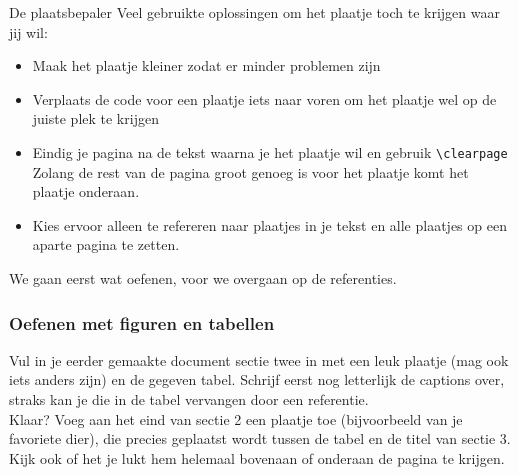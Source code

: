 \documentclass{beamer}
\begin{document}
\begin{frame}[allowframebreaks]{De plaatsbepaler}
	Veel gebruikte oplossingen om het plaatje toch te krijgen waar jij wil:
	\begin{itemize}
		\item Maak het plaatje kleiner zodat er minder problemen zijn
		\item Verplaats de code voor een plaatje iets naar voren om het plaatje wel op de juiste plek te krijgen
		\item Eindig je pagina na de tekst waarna je het plaatje wil en gebruik \texttt{\textbackslash clearpage} Zolang de rest van de pagina groot genoeg is voor het plaatje komt het plaatje onderaan.
		\item Kies ervoor alleen te refereren naar plaatjes in je tekst en alle plaatjes op een aparte pagina te zetten.
	\end{itemize}
We gaan eerst wat oefenen, voor we overgaan op de referenties.
\end{frame}

\begin{frame}
	\frametitle{Oefenen met figuren en tabellen}
	Vul in je eerder gemaakte document sectie twee in met een leuk plaatje (mag ook iets anders zijn) en de gegeven tabel. Schrijf eerst nog letterlijk de captions over, straks kan je die in de tabel vervangen door een referentie. \\
	Klaar?	Voeg aan het eind van sectie 2 een plaatje toe (bijvoorbeeld van je favoriete dier), die precies geplaatst wordt tussen de tabel en de titel van sectie 3. Kijk ook of het je lukt hem helemaal bovenaan of onderaan de pagina te krijgen.
\end{frame}
	
\end{document}
